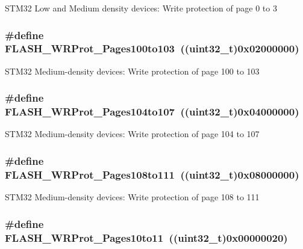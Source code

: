 STM32 Low and Medium density devices: Write protection of page 0 to 3 \hypertarget{group__Option__Bytes__Write__Protection_ga0c03cee6931c623ccdaae19233c81f4e}{
\subsubsection[{FLASH\_\-WRProt\_\-Pages100to103}]{\setlength{\rightskip}{0pt plus 5cm}\#define FLASH\_\-WRProt\_\-Pages100to103~((uint32\_\-t)0x02000000)}}
\label{group__Option__Bytes__Write__Protection_ga0c03cee6931c623ccdaae19233c81f4e}
STM32 Medium-\/density devices: Write protection of page 100 to 103 \hypertarget{group__Option__Bytes__Write__Protection_ga2e096d51e61a972c97093110211b3be5}{
\subsubsection[{FLASH\_\-WRProt\_\-Pages104to107}]{\setlength{\rightskip}{0pt plus 5cm}\#define FLASH\_\-WRProt\_\-Pages104to107~((uint32\_\-t)0x04000000)}}
\label{group__Option__Bytes__Write__Protection_ga2e096d51e61a972c97093110211b3be5}
STM32 Medium-\/density devices: Write protection of page 104 to 107 \hypertarget{group__Option__Bytes__Write__Protection_ga899e34df1ab5369d840461686eb9c318}{
\subsubsection[{FLASH\_\-WRProt\_\-Pages108to111}]{\setlength{\rightskip}{0pt plus 5cm}\#define FLASH\_\-WRProt\_\-Pages108to111~((uint32\_\-t)0x08000000)}}
\label{group__Option__Bytes__Write__Protection_ga899e34df1ab5369d840461686eb9c318}
STM32 Medium-\/density devices: Write protection of page 108 to 111 \hypertarget{group__Option__Bytes__Write__Protection_ga778d8038df46c0d25d9a24717a5c5dc9}{
\subsubsection[{FLASH\_\-WRProt\_\-Pages10to11}]{\setlength{\rightskip}{0pt plus 5cm}\#define FLASH\_\-WRProt\_\-Pages10to11~((uint32\_\-t)0x00000020)}}
